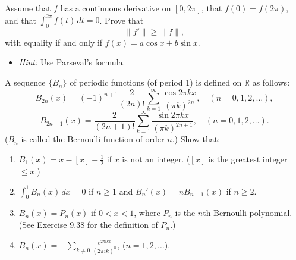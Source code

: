 \begin{problembox}
Assume that $f$ has a continuous derivative on $[0, 2\pi]$, that $f(0) = f(2\pi)$, and that $\int_0^{2\pi} f(t) \, dt = 0$. Prove that
\[
\|f'\| \geq \|f\|,
\]
with equality if and only if $f(x) = a \cos x + b \sin x$.
\begin{itemize}
\item \textit{Hint:} Use Parseval's formula.
\end{itemize}
\end{problembox}

\begin{problembox}
A sequence $\{B_n\}$ of periodic functions (of period 1) is defined on $\mathbb{R}$ as follows:
\[
B_{2n}(x) = (-1)^{n+1} \frac{2}{(2n)!} \sum_{k=1}^\infty \frac{\cos 2\pi k x}{(\pi k)^{2n}}, \quad (n = 0, 1, 2, \dots),
\]
\[
B_{2n+1}(x) = \frac{2}{(2n + 1)!} \sum_{k=1}^\infty \frac{\sin 2\pi k x}{(\pi k)^{2n+1}}, \quad (n = 0, 1, 2, \dots).
\]
($B_n$ is called the Bernoulli function of order $n$.) Show that:
\begin{enumerate}[label=(\alph*)]
\item $B_1(x) = x - [x] - \frac{1}{2}$ if $x$ is not an integer. ($[x]$ is the greatest integer $\leq x$.)
\item $\int_0^1 B_n(x) \, dx = 0$ if $n \geq 1$ and $B_n'(x) = n B_{n-1}(x)$ if $n \geq 2$.
\item $B_n(x) = P_n(x)$ if $0 < x < 1$, where $P_n$ is the $n$th Bernoulli polynomial. (See Exercise 9.38 for the definition of $P_n$.)
\item $B_n(x) = -\sum_{k \neq 0} \frac{e^{2\pi i k x}}{(2\pi i k)^n}$, ($n = 1, 2, \dots$).
\end{enumerate}
\end{problembox}

